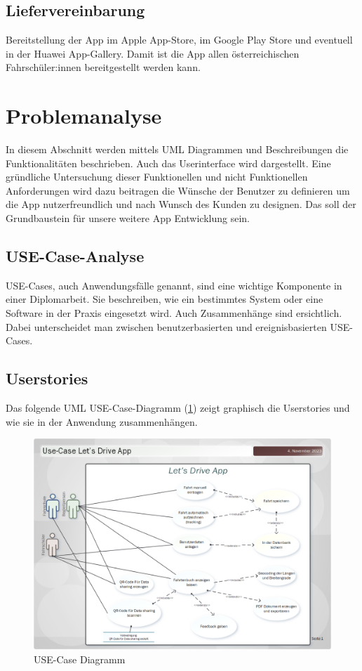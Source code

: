 \subsection{Liefervereinbarung}
Bereitstellung der App im Apple App-Store, im Google Play Store und eventuell in der Huawei App-Gallery. Damit ist die App allen österreichischen Fahrschüler:innen bereitgestellt werden kann.

\newpage
\section{Problemanalyse}
In diesem Abschnitt werden mittels UML Diagrammen und Beschreibungen die Funktionalitäten beschrieben. Auch das Userinterface wird dargestellt. Eine gründliche Untersuchung dieser Funktionellen und nicht Funktionellen Anforderungen wird dazu beitragen die Wünsche der Benutzer zu definieren um die App nutzerfreundlich und nach Wunsch des Kunden zu designen. Das soll der Grundbaustein für unsere weitere App Entwicklung sein.

\subsection{USE-Case-Analyse}

USE-Cases, auch Anwendungsfälle genannt, sind eine wichtige Komponente in einer Diplomarbeit. Sie beschreiben, wie ein bestimmtes System oder eine Software in der Praxis eingesetzt wird. Auch Zusammenhänge sind ersichtlich. Dabei unterscheidet man zwischen benutzerbasierten und ereignisbasierten USE-Cases.

\subsection{Userstories}

Das folgende UML USE-Case-Diagramm (\ref{fig:USE-Case-Diagramm}) zeigt graphisch die Userstories und wie sie in der Anwendung zusammenhängen.

\begin{figure}[H]
	\centering
	\includegraphics[width=15cm]{figures/usecase_diagramm.png}
	\caption{USE-Case Diagramm}
	\label{fig:USE-Case-Diagramm}
\end{figure}


